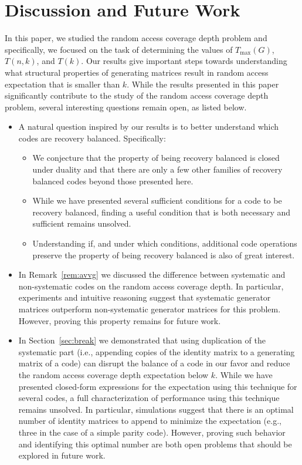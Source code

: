 \documentclass[11pt,a4paper,reqno,twoside]{amsart}
\theoremstyle{definition}
\newcommand{\tmax}{T_{\max}}
\begin{document}
\section{Discussion and Future Work} \label{sec:conclusion}
In this paper, we studied the random access coverage depth problem and specifically, we focused on the task of determining the values of $\tmax(G)$, $T(n,k)$, and $T(k)$. Our results give important steps towards understanding what structural properties of generating matrices result in random access expectation that is smaller than $k$. While the results presented in this paper significantly contribute to the study of the random access coverage depth problem, several interesting questions remain open, as listed below.
\begin{itemize}
     \item A natural question inspired by our results is to better understand which codes are recovery balanced. Specifically: \begin{itemize} 
     \item We conjecture that the property of being recovery balanced is closed under duality and that there are only a few other families of recovery balanced codes beyond those presented here. 
     \item While we have presented several sufficient conditions for a code to be recovery balanced, finding a useful condition that is both necessary and sufficient remains unsolved. 
     \item Understanding if, and under which conditions, additional code operations preserve the property of being recovery balanced is also of great interest. 
    \end{itemize}
    \item In Remark~\ref{rem:avvg} we discussed the difference between systematic and non-systematic codes on the random access coverage depth. In particular, experiments and intuitive reasoning suggest that systematic generator matrices outperform non-systematic generator matrices for this problem. However, proving this property remains for future work. 
    \item In Section~\ref{sec:break} we demonstrated that using duplication of the systematic part (i.e., appending copies of the identity matrix to a generating matrix of a code) can disrupt the balance of a code in our favor and reduce the random access coverage depth expectation below $k$. While we have presented closed-form expressions for the expectation using this technique for several codes, a full characterization of performance using this technique remains unsolved. In particular, simulations suggest that there is an optimal number of identity matrices to append to minimize the expectation (e.g., three in the case of a simple parity code). However, proving such behavior and identifying this optimal number are both open problems that should be explored in future work. 

\end{itemize}
\end{document}
